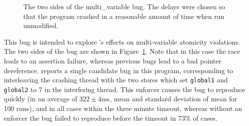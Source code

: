 \begin{figure}
  \hfill
  \caption{The two sides of the multi\_variable bug. The delays were
    chosen so that the program crashed in a reasonable amount of time
    when run unmodified.}
  \label{fig:eval:multi_variable}
\end{figure}

This bug is intended to explore {\technique}'s effects on
multi-variable atomicity violations.  The two sides of the bug are
shown in Figure~\ref{fig:eval:multi_variable}.  Note that in this case
the race leads to an assertion failure, whereas previous bugs lead to
a bad pointer dereference.  {\Technique} reports a single candidate
bug in this program, corresponding to interleaving the crashing thread
with the two stores which set \texttt{global1} and \texttt{global2} to
7 in the interfering thread.  This enforcer causes the bug to
reproduce quickly (in an average of $322 \pm 4$ms, mean and standard
deviation of mean for 100 runs), and in all cases within the three
minute timeout, whereas without an enforcer the bug failed to
reproduce before the timeout in 73\% of cases.

